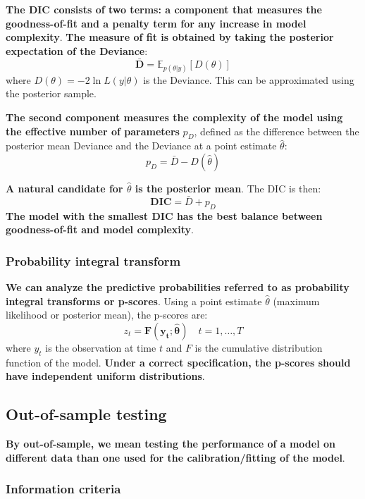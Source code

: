 \documentclass[12pt,a4paper]{article}
\begin{document}
\textbf{The DIC consists of two terms: a component that measures the goodness-of-fit and a penalty term for any increase in model complexity}. \textbf{The measure of fit is obtained by taking the posterior expectation of the Deviance}:
\[
\bar{\mathbf{D}} = \mathbb{E}_{p(\theta|y)}[D(\theta)]
\]
where $D(\theta) = -2 \ln L(y|\theta)$ is the Deviance. This can be approximated using the posterior sample.

\vspace{0.3em}

\textbf{The second component measures the complexity of the model using the effective number of parameters} $p_D$, defined as the difference between the posterior mean Deviance and the Deviance at a point estimate $\hat{\theta}$:
\[
p_D = \bar{D} - D(\hat{\theta})
\]

\textbf{A natural candidate for $\hat{\theta}$ is the posterior mean}. The DIC is then:
\[
\mathbf{\text{DIC}} = \bar{D} + p_D
\]
\textbf{The model with the smallest DIC has the best balance between goodness-of-fit and model complexity}.

\vspace{0.5em}

\subsubsection{Probability integral transform}

\textbf{We can analyze the predictive probabilities referred to as probability integral transforms or p-scores}. Using a point estimate $\hat{\theta}$ (maximum likelihood or posterior mean), the p-scores are:
\[
z_t = \mathbf{F(y_t; \hat{\theta})} \quad t = 1, \ldots, T
\]
where $y_t$ is the observation at time $t$ and $F$ is the cumulative distribution function of the model. \textbf{Under a correct specification, the p-scores should have independent uniform distributions}.

\subsection{Out-of-sample testing}

\textbf{By out-of-sample, we mean testing the performance of a model on different data than one used for the calibration/fitting of the model}.

\vspace{0.5em}

\subsubsection{Information criteria}
\end{document}
